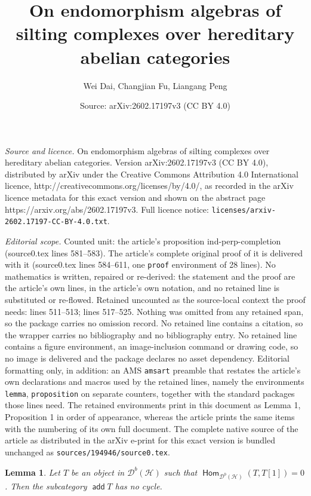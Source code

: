 \documentclass[10pt,a4paper]{amsart}
\title{On endomorphism algebras of silting complexes over hereditary abelian categories}
\author{Wei Dai, Changjian Fu, Liangang Peng}
\date{Source: arXiv:2602.17197v3 (CC BY 4.0)}
\newtheorem{lemma}{Lemma}
\newcommand{\Hom}{\opname{Hom}}
\newcommand{\add}{\opname{add}\nolimits}
\newcommand{\cd}{{\mathcal D}}
\newcommand{\der}{\cd}
\newcommand{\opname}[1]{\operatorname{\mathsf{#1}}}
\begin{document}
\maketitle

\noindent\emph{Source and licence.} On endomorphism algebras of silting complexes over hereditary abelian categories. Version arXiv:2602.17197v3 (CC BY 4.0), distributed by arXiv under the Creative Commons Attribution 4.0 International licence, http://creativecommons.org/licenses/by/4.0/, as recorded in the arXiv licence metadata for this exact version and shown on the abstract page https://arxiv.org/abs/2602.17197v3. Full licence notice: \texttt{licenses/arxiv-2602.17197-CC-BY-4.0.txt}.\par\smallskip

\noindent\textit{Editorial scope.} Counted unit: the article's proposition ind-perp-completion (source0.tex lines 581--583). The article's complete original proof of it is delivered with it (source0.tex lines 584--611, one \texttt{proof} environment of 28 lines). No mathematics is written, repaired or re-derived: the statement and the proof are the article's own lines, in the article's own notation, and no retained line is substituted or re-flowed.  Retained uncounted as the source-local context the proof needs: lines 511--513; lines 517--525.  Nothing was omitted from any retained span, so the package carries no omission record.  No retained line contains a citation, so the wrapper carries no bibliography and no bibliography entry.  No retained line contains a figure environment, an image-inclusion command or drawing code, so no image is delivered and the package declares no asset dependency.  Editorial formatting only, in addition: an AMS \texttt{amsart} preamble that restates the article's own declarations and macros used by the retained lines, namely the environments \texttt{lemma}, \texttt{proposition} on separate counters, together with the standard packages those lines need.  The retained environments print in this document as Lemma 1, Proposition 1 in order of appearance, whereas the article prints the same items with the numbering of its own full document.  The complete native source of the article as distributed in the arXiv e-print for this exact version is bundled unchanged as \texttt{sources/194946/source0.tex}.
\begin{lemma}\label{l:no-cycle}
Let $T$ be an object in $\der^b(\mathcal{H})$ such that $\Hom_{\der^b(\mathcal{H})}(T, T[1])=0$. Then the subcategory $\add T$ has no cycle.
\end{lemma}
\end{document}
